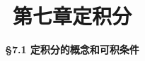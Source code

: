 \everymath{\displaystyle}



\title[第七章\\
定积分]{\texorpdfstring{\LARGE \bfseries 第七章\quad 定积分}{第七章 定积分}} %
\author[\smaller \S 7.1\\
定积分概念和可积条件] %
{\Large \bfseries \S 7.1 定积分的概念和可积条件}
\date{}





\begin{frame}

\titlepage %

\end{frame}




